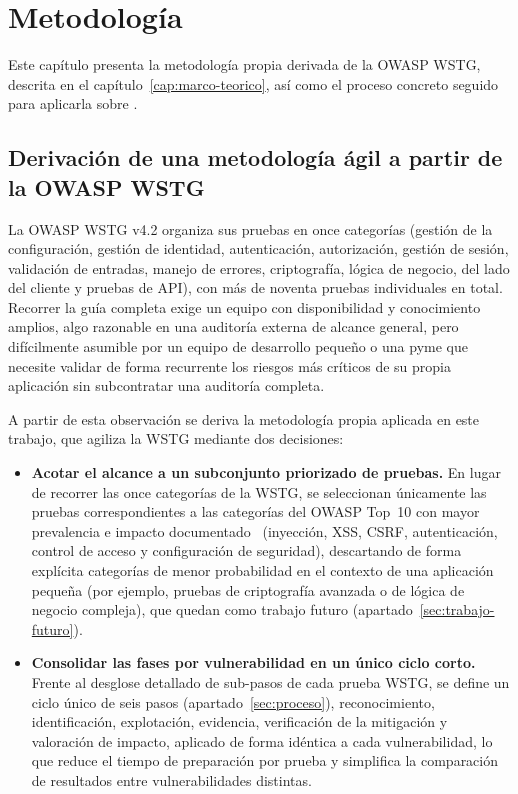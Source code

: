 \chapter{Metodología}
\label{cap:metodologia}

Este capítulo presenta la metodología propia derivada de la OWASP WSTG,
descrita en el capítulo~\ref{cap:marco-teorico}, así como el proceso
concreto seguido para aplicarla sobre \breachlab.

\section{Derivación de una metodología ágil a partir de la OWASP WSTG}
\label{sec:derivacion-metodologia}

La OWASP WSTG v4.2 organiza sus pruebas en once categorías (gestión de la
configuración, gestión de identidad, autenticación, autorización, gestión de
sesión, validación de entradas, manejo de errores, criptografía, lógica de
negocio, del lado del cliente y pruebas de API), con más de noventa pruebas
individuales en total. Recorrer la guía completa exige un equipo con
disponibilidad y conocimiento amplios, algo razonable en una auditoría
externa de alcance general, pero difícilmente asumible por un equipo de
desarrollo pequeño o una pyme que necesite validar de forma recurrente los
riesgos más críticos de su propia aplicación sin subcontratar una auditoría
completa.

A partir de esta observación se deriva la metodología propia aplicada en
este trabajo, que agiliza la WSTG mediante dos decisiones:

\begin{itemize}
\item \textbf{Acotar el alcance a un subconjunto priorizado de pruebas.} En
  lugar de recorrer las once categorías de la WSTG, se seleccionan
  únicamente las pruebas correspondientes a las categorías del OWASP Top~10
  con mayor prevalencia e impacto documentado~
  (inyección, XSS, CSRF, autenticación, control de acceso y configuración de
  seguridad), descartando de forma explícita categorías de menor
  probabilidad en el contexto de una aplicación pequeña (por ejemplo,
  pruebas de criptografía avanzada o de lógica de negocio compleja), que
  quedan como trabajo futuro (apartado~\ref{sec:trabajo-futuro}).
\item \textbf{Consolidar las fases por vulnerabilidad en un único ciclo
  corto.} Frente al desglose detallado de sub-pasos de cada prueba WSTG, se
  define un ciclo único de seis pasos (apartado~\ref{sec:proceso}),
  reconocimiento, identificación, explotación, evidencia, verificación de la
  mitigación y valoración de impacto, aplicado de forma idéntica a cada
  vulnerabilidad, lo que reduce el tiempo de preparación por prueba y
  simplifica la comparación de resultados entre vulnerabilidades distintas.
\end{itemize}

